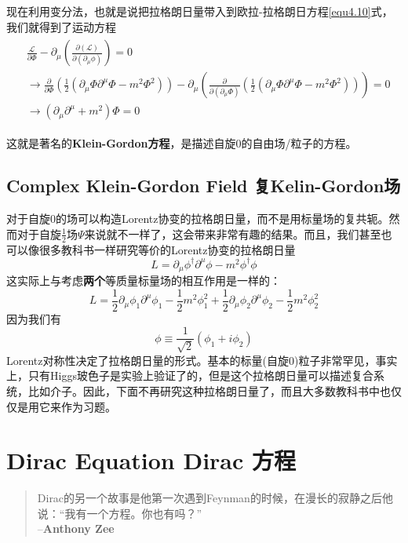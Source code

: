 现在利用变分法，也就是说把拉格朗日量带入到欧拉-拉格朗日方程\eqref{equ4.10}式，我们就得到了运动方程
\begin{align}
\label{equ6.5}
\begin{split}
&\frac{\mathscr{L}}{\partial\Phi}-\partial_\mu\left(\frac{\partial(\mathscr{L})}{\partial(\partial_\mu\phi)}\right)=0\\
&\rightarrow\frac{\partial}{\partial\Phi}\left(\frac{1}{2}(\partial_\mu\Phi\partial^\mu\Phi-m^2\Phi^2)\right)-\partial_\mu\left(\frac{\partial}{\partial(\partial_\mu\Phi)}\left(\frac{1}{2}(\partial_\mu\Phi\partial^\mu\Phi-m^2\Phi^2)\right)\right)=0 \\
&\rightarrow(\partial_\mu\partial^\mu+m^2)\Phi=0
\end{split}
\end{align}

这就是著名的{\bf Klein-Gordon方程}，是描述自旋$0$的自由场/粒子的方程。

\subsection[复Klein-Gordon场]{Complex Klein-Gordon Field \quad 复Kelin-Gordon场}\label{sec6.2.1}

对于自旋$0$的场可以构造Lorentz协变的拉格朗日量，而不是用标量场的复共轭。然而对于自旋$\frac{1}{2}$场$\Psi$来说就不一样了，这会带来非常有趣的结果。而且，我们甚至也可以像很多教科书一样研究等价的Lorentz协变的拉格朗日量
\[L=\partial_\mu\phi^\dagger\partial^\mu\phi-m^2\phi^\dagger\phi \]
这实际上与考虑{\bf 两个}等质量标量场的相互作用是一样的：
\[L=\frac{1}{2}\partial_\mu\phi_1\partial^\mu\phi_1-\frac{1}{2}m^2\phi_1^2+\frac{1}{2}\partial_\mu\phi_2\partial^\mu\phi_2-\frac{1}{2}m^2\phi_2^2 \]
因为我们有
\[\phi\equiv\frac{1}{\sqrt2}(\phi_1+i\phi_2) \]
Lorentz对称性决定了拉格朗日量的形式。基本的标量(自旋$0$)粒子非常罕见，事实上，只有Higgs玻色子是实验上验证了的，但是这个拉格朗日量可以描述复合系统，比如介子。因此，下面不再研究这种拉格朗日量了，而且大多数教科书中也仅仅是用它来作为习题。

\section[Dirac方程]{Dirac Equation \quad Dirac 方程}\label{sec6.3}
\begin{quote}
Dirac的另一个故事是他第一次遇到Feynman的时候，在漫长的寂静之后他说：“我有一个方程。你也有吗？”\\
\phantom{Dirac的另一个故事是他第一次遇到}--{\bf Anthony Zee}
\end{quote}

